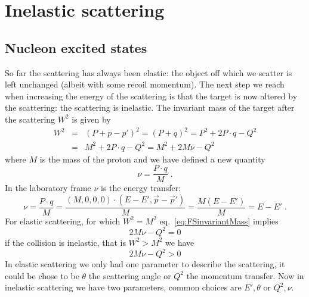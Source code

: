\documentclass[12pt]{article}
\begin{document}
\section{Inelastic scattering}
\subsection{Nucleon excited states}
So far the scattering has always been elastic: the object off which we scatter is left unchanged (albeit with some recoil momentum). The next step we reach when increasing the energy of the scattering is that the target is now altered by the scattering: the scattering is inelastic. 
The invariant mass of the target after the scattering $W^2$ is given by
\begin{eqnarray}\label{eq:FSinvariantMass}
W^2&=&\left(P+p-p'\right)^2=\left(P+q\right)^2=P^2+2P\cdot q-Q^2
\\
&=&M^2+2 P\cdot q -Q^2=M^2+2M\nu -Q^2
\end{eqnarray}
where $M$ is the mass of the proton and we have defined a new quantity
\begin{equation}\label{eq:DISnu}
\nu=\frac{P\cdot q}{M}\;.
\end{equation}
In the laboratory frame $\nu$ is the energy transfer:
\[\nu=\frac{P\cdot q}{M}=\frac{(M,0,0,0)\cdot(E-E',\vec p -\vec p')}{M}=\frac{M(E-E')}{M}=E-E'\;.\]
For elastic scattering, for which $W^2=M^2$ eq.~\ref{eq:FSinvariantMass} implies
\[2M\nu-Q^2=0\]
if the collision is inelastic, that is $W^2>M^2$ we have
\begin{equation}\label{eq:xInequality}
2M\nu-Q^2>0
\end{equation}
In elastic scattering we only had one parameter to describe the scattering, it could be chose to be $\theta$ the scattering angle or $Q^2$ the momentum transfer. Now in inelastic scattering we have two parameters, common choices are $E',\theta$ or $Q^2,\nu$.
%
\end{document}
